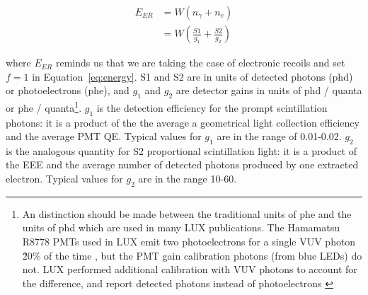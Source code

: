 \begin{equation}
\label{eq:energy}
\begin{split}
E_{ER} &= W (n_{\gamma} + n_{e} ) \\
   &= W (\frac{S1}{g_{1}} + \frac{S2}{g_{2}})
\end{split}
\end{equation}

where $E_{ER}$ reminds us that we are taking the case of electronic recoils and set $f=1$ in Equation~\ref{eq:energy}. S1 and S2 are in units of detected photons (phd) or photoelectrons (phe), and $g_{1}$ and $g_{2}$ are detector gains in units of phd / quanta or phe / quanta\footnote{An distinction should be made between the traditional units of phe and the units of phd which are used in many LUX publications. The Hamamatsu R8778 PMTs used in LUX emit two photoelectrons for a single VUV photon \~20\% of the time \cite{Faham2015}, but the PMT gain calibration photons (from blue LEDs) do not. LUX performed additional calibration with VUV photons to account for the difference, and report detected photons instead of photoelectrons \cite{LUX:Run03Comprehensive}}. $g_{1}$ is the detection efficiency for the prompt scintillation photons: it is a product of the the average a geometrical light collection efficiency and the average \ac{PMT} \ac{QE}. Typical values for $g_{1}$ are in the range of 0.01-0.02. $g_{2}$ is the analogous quantity for S2 proportional scintillation light: it is a product of the \ac{EEE} and the average number of detected photons produced by one extracted electron. Typical values for $g_{2}$ are in the range 10-60.



